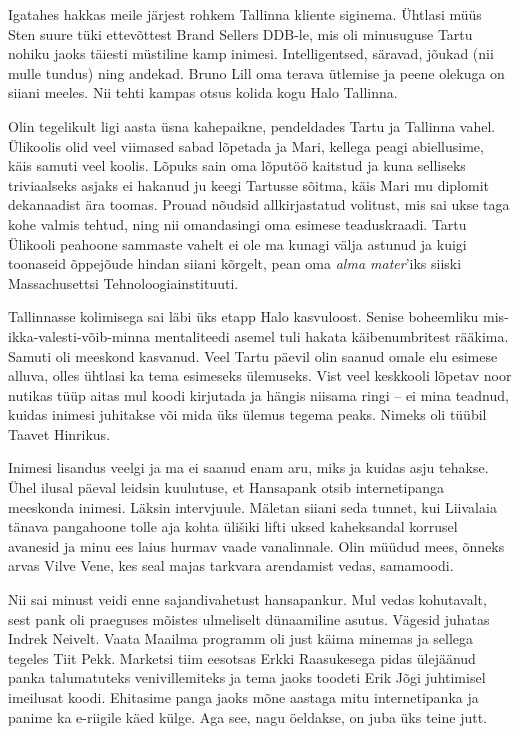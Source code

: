 Igatahes hakkas meile järjest rohkem Tallinna kliente siginema. Ühtlasi müüs Sten 
suure tüki ettevõttest Brand Sellers DDB-le, mis oli 
minusuguse Tartu nohiku jaoks täiesti müstiline kamp inimesi. Intelligentsed, 
säravad, jõukad (nii mulle tundus) ning andekad. Bruno Lill oma terava ütlemise ja peene olekuga on siiani meeles. Nii tehti 
kampas otsus kolida kogu Halo Tallinna. 

Olin tegelikult ligi aasta üsna kahepaikne, pendeldades Tartu ja 
Tallinna vahel. Ülikoolis olid veel viimased sabad lõpetada ja 
Mari, kellega peagi abiellusime, käis samuti veel 
koolis. Lõpuks sain oma lõputöö kaitstud ja kuna selliseks triviaalseks asjaks ei 
hakanud ju keegi Tartusse sõitma, käis Mari mu diplomit dekanaadist ära toomas. 
Prouad nõudsid allkirjastatud volitust, mis sai ukse taga kohe valmis tehtud, 
ning nii omandasingi oma esimese teaduskraadi. Tartu Ülikooli peahoone 
sammaste vahelt ei ole ma kunagi välja astunud ja kuigi toonaseid õppejõude 
hindan siiani kõrgelt, pean oma \emph{alma mater}'iks siiski Massachusettsi 
Tehnoloogiainstituuti. 

Tallinnasse kolimisega sai läbi üks etapp Halo kasvuloost. Senise boheemliku 
mis-ikka-valesti-võib-minna mentaliteedi asemel tuli hakata käibenumbritest 
rääkima. Samuti oli meeskond kasvanud. Veel Tartu päevil olin saanud omale 
elu esimese alluva, olles ühtlasi ka tema esimeseks ülemuseks. Vist veel 
keskkooli lõpetav noor nutikas tüüp aitas mul koodi kirjutada ja hängis niisama 
ringi -- ei mina teadnud, kuidas inimesi juhitakse või mida üks ülemus tegema 
peaks. Nimeks oli tüübil Taavet Hinrikus. 

Inimesi 
lisandus veelgi ja ma ei saanud enam aru, miks ja kuidas asju tehakse. Ühel ilusal päeval
leidsin kuulutuse, et Hansapank 
otsib internetipanga meeskonda inimesi. Läksin intervjuule. Mäletan siiani 
seda tunnet, kui Liivalaia tänava pangahoone tolle aja kohta ülišiki lifti 
uksed kaheksandal korrusel avanesid ja minu ees laius hurmav vaade 
vanalinnale. Olin müüdud mees, õnneks arvas Vilve Vene, 
kes seal majas tarkvara arendamist vedas, samamoodi. 

Nii sai minust veidi enne sajandivahetust 
hansapankur. Mul vedas kohutavalt, sest pank oli praeguses mõistes ulmeliselt 
dünaamiline asutus. Vägesid juhatas Indrek Neivelt. 
Vaata Maailma programm oli just käima minemas ja sellega tegeles Tiit 
Pekk. Marketsi tiim eesotsas Erkki 
Raasukesega pidas ülejäänud panka talumatuteks 
venivillemiteks ja tema jaoks toodeti Erik Jõgi juhtimisel imeilusat 
koodi. Ehitasime panga jaoks mõne aastaga mitu internetipanka ja panime ka e-riigile käed külge. 
Aga see, nagu öeldakse, on juba üks teine jutt.

